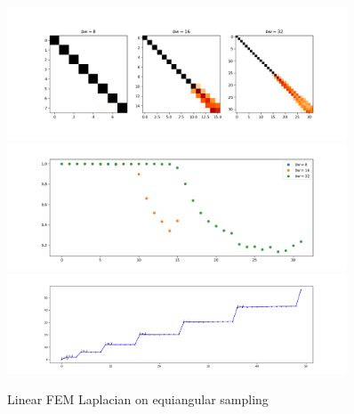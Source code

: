 \begin{figure}[h]
	\label{fig:FEMequiangular}
	\caption{Linear FEM Laplacian on equiangular sampling}
	\centering
	\includegraphics[width=0.9\textwidth]{../codes/03.FEM_laplacian/equiangular/normal/img/linearFEM.png}
	\includegraphics[width=0.9\textwidth]{../codes/03.FEM_laplacian/equiangular/normal/img/linearFEM_diagonal.png}	
	\includegraphics[width=0.9\textwidth]{../codes/03.FEM_laplacian/equiangular/normal/img/FEM_eigenvalues_16.png}	
\end{figure}


